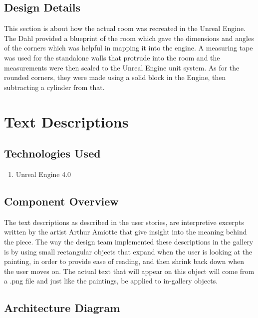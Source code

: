 


\subsection{Design Details}
This section is about how the actual room was recreated in the Unreal Engine.  The Dahl provided a blueprint of the room which gave the dimensions and angles of the corners which was helpful in mapping it into the engine.  A measuring tape was used for the standalone walls that protrude into the room and the measurements were then scaled to the Unreal Engine unit system.  As for the rounded corners, they were made using a solid block in the Engine, then subtracting a cylinder from that.

\section{Text Descriptions}

\subsection{Technologies Used}
	\begin{enumerate}
		\item Unreal Engine 4.0
	\end{enumerate}

\subsection{Component Overview}
The text descriptions as described in the user stories, are interpretive excerpts written by the artist Arthur Amiotte that give insight into the meaning behind the piece.  The way the design team implemented these descriptions in the gallery is by using small rectangular objects that expand when the user is looking at the painting, in order to provide ease of reading, and then shrink back down when the user moves on.  The actual text that will appear on this object will come from a .png file and just like the paintings, be applied to in-gallery objects. 

\subsection{Architecture Diagram}
